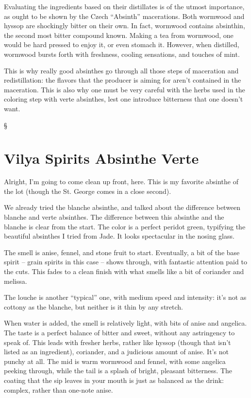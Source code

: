 \documentclass[12pt,letterpaper,oneside]{memoir}
\newcommand\secdiv{
  \begin{center}
    \S
  \end{center}
}
\begin{document}
  Evaluating the ingredients based on their distillates is of the utmost importance, as ought to be shown by the Czech ``Absinth'' macerations.  Both wormwood and hyssop are shockingly bitter on their own.  In fact, wormwood contains absinthin, the second most bitter compound known.  Making a tea from wormwood, one would be hard pressed to enjoy it, or even stomach it.  However, when distilled, wormwood bursts forth with freshness, cooling sensations, and touches of mint.

  This is why really good absinthes go through all those steps of maceration and redistillation: the flavors that the producer is aiming for aren't contained in the maceration.  This is also why one must be very careful with the herbs used in the coloring step with verte absinthes, lest one introduce bitterness that one doesn't want.

  \secdiv

  \section*{Vilya Spirits Absinthe Verte}

  Alright, I'm going to come clean up front, here.  This is my favorite absinthe of the lot (though the St. George comes in a close second).

  We already tried the blanche absinthe, and talked about the difference between blanche and verte absinthes.  The difference between this absinthe and the blanche is clear from the start.  The color is a perfect peridot green, typifying the beautiful absinthes I tried from Jade.  It looks spectacular in the nosing glass.

  The smell is anise, fennel, and stone fruit to start.  Eventually, a bit of the base spirit -- grain spirits in this case -- shows through, with fantastic attention paid to the cuts.  This fades to a clean finish with what smells like a bit of coriander and melissa.

  The louche is another ``typical'' one, with medium speed and intensity: it's not as cottony as the blanche, but neither is it thin by any stretch.

  When water is added, the smell is relatively light, with bits of anise and angelica.  The taste is a perfect balance of bitter and sweet, without any astringency to speak of.  This leads with fresher herbs, rather like hyssop (though that isn't listed as an ingredient), coriander, and a judicious amount of anise.  It's not punchy at all.  The mid is warm wormwood and fennel, with some angelica peeking through, while the tail is a splash of bright, pleasant bitterness.  The coating that the sip leaves in your mouth is just as balanced as the drink: complex, rather than one-note anise.
\end{document}
